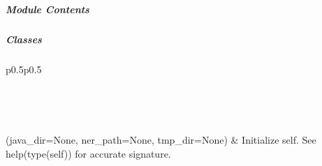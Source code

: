 \documentclass[letterpaper,10pt,english]{sphinxmanual}
\begin{document}
\subparagraph{}
\label{\detokenize{autoapi/pine/pipelines/opennlp_NER_pipeline/index:module-pine.pipelines.opennlp_NER_pipeline}}\label{\detokenize{autoapi/pine/pipelines/opennlp_NER_pipeline/index:pine-pipelines-opennlp-ner-pipeline}}\label{\detokenize{autoapi/pine/pipelines/opennlp_NER_pipeline/index::doc}}

\subparagraph{Module Contents}
\label{\detokenize{autoapi/pine/pipelines/opennlp_NER_pipeline/index:module-contents}}

\subparagraph{Classes}
\label{\detokenize{autoapi/pine/pipelines/opennlp_NER_pipeline/index:classes}}

\begin{savenotes}\sphinxatlongtablestart\begin{longtable}[c]{p{0.5\linewidth}p{0.5\linewidth}}
\hline

\endfirsthead

%
{}\\
\hline

\endhead

\hline
{}\\
\endfoot

\endlastfoot

{\hyperref[\detokenize{autoapi/pine/pipelines/opennlp_NER_pipeline/index:pine.pipelines.opennlp_NER_pipeline.opennlp_NER}]{}}(java\_dir=None, ner\_path=None, tmp\_dir=None)
&
Initialize self.  See help(type(self)) for accurate signature.
\\
\hline
\end{longtable}\sphinxatlongtableend\end{savenotes}

\begin{fulllineitems}
\label{\detokenize{autoapi/pine/pipelines/opennlp_NER_pipeline/index:pine.pipelines.opennlp_NER_pipeline.config}}
\end{fulllineitems}
\end{document}

